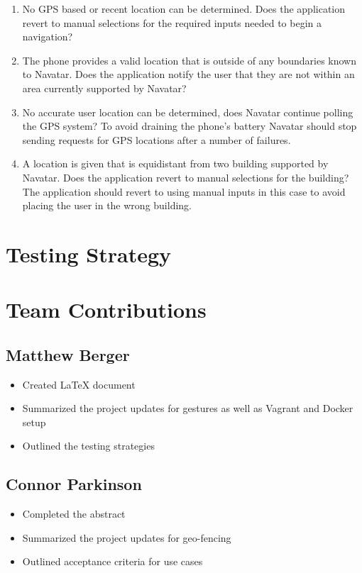 \documentclass{scrreprt}
\begin{document}
\begin{enumerate}
	\item No GPS based or recent location can be determined. Does the application revert to manual selections for the required inputs needed to begin a navigation?
	
	\item The phone provides a valid location that is outside of any boundaries known to Navatar. Does the application notify the user that they are not within an area currently supported by Navatar?
	
	\item No accurate user location can be determined, does Navatar continue polling the GPS system? To avoid draining the phone’s battery Navatar should stop sending requests for GPS locations after a number of failures.
	
	\item A location is given that is equidistant from two building supported by Navatar. Does the application revert to manual selections for the building? The application should revert to using manual inputs in this case to avoid placing the user in the wrong building.

\end{enumerate}

\chapter{Testing Strategy}

\chapter{Team Contributions}
	\section{Matthew Berger}
		\begin{itemize}
			\item Created LaTeX document
			\item Summarized the project updates for gestures as well as Vagrant and Docker setup
			\item Outlined the testing strategies
		\end{itemize}
	\section{Connor Parkinson}
		\begin{itemize}
			\item Completed the abstract
			\item Summarized the project updates for geo-fencing
			\item Outlined acceptance criteria for use cases
		\end{itemize}
\end{document}
